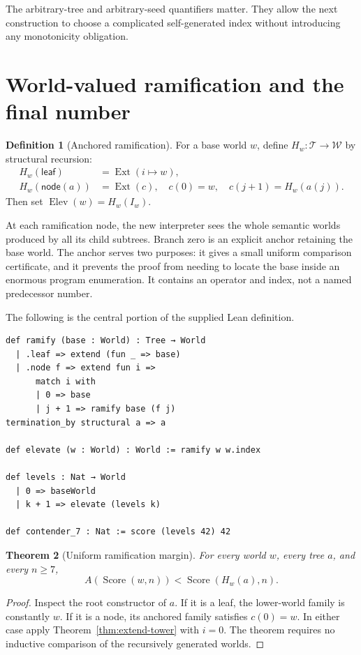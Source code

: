 \documentclass[11pt]{article}
\newtheorem{theorem}{Theorem}[section]
\theoremstyle{definition}
\newtheorem{definition}[theorem]{Definition}
\theoremstyle{remark}
\newcommand{\Tree}{\mathcal T}
\newcommand{\World}{\mathcal W}
\newcommand{\Score}{\operatorname{Score}}
\newcommand{\Ext}{\operatorname{Ext}}
\newcommand{\Elev}{\operatorname{Elev}}
\begin{document}
The arbitrary-tree and arbitrary-seed quantifiers matter. They allow the
next construction to choose a complicated self-generated index without
introducing any monotonicity obligation.

\section{World-valued ramification and the final number}\label{sec:ramify}

\begin{definition}[Anchored ramification]
For a base world $w$, define $H_w:\Tree\to\World$ by structural recursion:
\begin{align*}
 H_w(\mathsf{leaf})&=\Ext(i\mapsto w),\\
 H_w(\mathsf{node}(a))&=\Ext(c),
 \quad c(0)=w,\quad c(j+1)=H_w(a(j)).
\end{align*}
Then set $\Elev(w)=H_w(I_w)$.
\end{definition}

At each ramification node, the new interpreter sees the whole semantic worlds
produced by all its child subtrees. Branch zero is an explicit anchor
retaining the base world. The anchor serves two purposes: it gives a small
uniform comparison certificate, and it prevents the proof from needing to
locate the base inside an enormous program enumeration. It contains an
operator and index, not a named predecessor number.

The following is the central portion of the supplied Lean definition.
\begin{lstlisting}
def ramify (base : World) : Tree → World
  | .leaf => extend (fun _ => base)
  | .node f => extend fun i =>
      match i with
      | 0 => base
      | j + 1 => ramify base (f j)
termination_by structural a => a

def elevate (w : World) : World := ramify w w.index

def levels : Nat → World
  | 0 => baseWorld
  | k + 1 => elevate (levels k)

def contender_7 : Nat := score (levels 42) 42
\end{lstlisting}

\begin{theorem}[Uniform ramification margin]\label{thm:ramify-margin}
For every world $w$, every tree $a$, and every $n\ge7$,
\[
                    A(\Score(w,n))<\Score(H_w(a),n).
\]
\end{theorem}
\begin{proof}
Inspect the root constructor of $a$. If it is a leaf, the lower-world family
is constantly $w$. If it is a node, its anchored family satisfies $c(0)=w$.
In either case apply Theorem~\ref{thm:extend-tower} with $i=0$. The theorem
requires no inductive comparison of the recursively generated worlds.
\end{proof}
\end{document}
